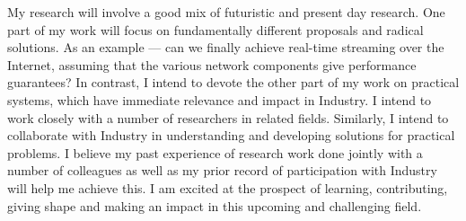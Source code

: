 \documentclass[a4paper, 10pt]{article}
\begin{document}

 My research will involve a good mix of futuristic and present 
day research. 
One part of my work will focus on fundamentally different proposals and
radical solutions. As an example
--- can we finally achieve real-time streaming over the Internet,
assuming that the various network components give performance guarantees?
In contrast, I intend to devote the other part of my work 
on practical systems, which have immediate relevance and impact in Industry.
I intend to work closely with a number of
researchers in related fields. Similarly, I intend to
collaborate with Industry in understanding and developing solutions
for practical problems. I believe my past experience of research
work done jointly with a number of colleagues as well as my prior record
of participation with Industry will help me achieve this. 
I am excited at the
prospect of learning, contributing, giving shape and making an
impact in this upcoming and challenging field.  



\vspace{0.5cm}


\begin{footnotesize}




\end{footnotesize}
\end{document}
